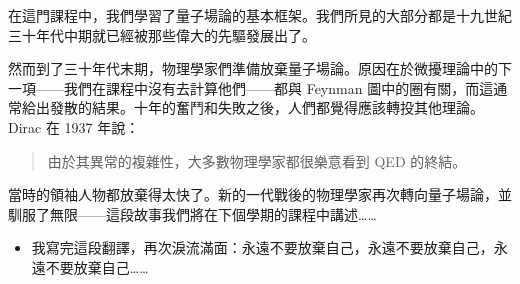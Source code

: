 \documentclass{article}
\begin{document}
在這門課程中，我們學習了量子場論的基本框架。我們所見的大部分都是十九世紀三十年代中期就已經被那些偉大的先驅發展出了。

然而到了三十年代末期，物理學家們準備放棄量子場論。原因在於微擾理論中的下一項——我們在課程中沒有去計算他們——都與 Feynman 圖中的圈有關，而這通常給出發散的結果。十年的奮鬥和失敗之後，人們都覺得應該轉投其他理論。Dirac 在 1937 年說：

\begin{quote}
  由於其異常的複雜性，大多數物理學家都很樂意看到 QED 的終結。
\end{quote}

當時的領袖人物都放棄得太快了。新的一代戰後的物理學家再次轉向量子場論，並馴服了無限——這段故事我們將在下個學期的課程中講述……

\begin{itemize}
  \item 我寫完這段翻譯，再次淚流滿面：永遠不要放棄自己，永遠不要放棄自己，永遠不要放棄自己……
\end{itemize}
\end{document}
